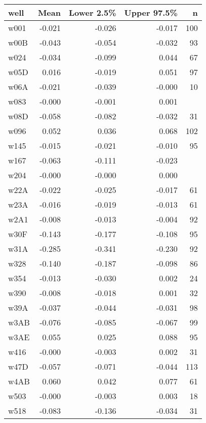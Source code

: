 \begin{table}[ht]
\centering
\begingroup\fontsize{9pt}{9pt}\selectfont
\begin{tabular}{lrrrr}
  \hline
well & Mean & Lower 2.5\% & Upper 97.5\% & n \\ 
  \hline
w001 & -0.021 & -0.026 & -0.017 &  100 \\ 
  w00B & -0.043 & -0.054 & -0.032 &   93 \\ 
  w024 & -0.034 & -0.099 & 0.044 &   67 \\ 
  w05D & 0.016 & -0.019 & 0.051 &   97 \\ 
  w06A & -0.021 & -0.039 & -0.000 &   10 \\ 
  w083 & -0.000 & -0.001 & 0.001 &  \\ 
  w08D & -0.058 & -0.082 & -0.032 &   31 \\ 
  w096 & 0.052 & 0.036 & 0.068 &  102 \\ 
  w145 & -0.015 & -0.021 & -0.010 &   95 \\ 
  w167 & -0.063 & -0.111 & -0.023 &  \\ 
  w204 & -0.000 & -0.000 & 0.000 &  \\ 
  w22A & -0.022 & -0.025 & -0.017 &   61 \\ 
  w23A & -0.016 & -0.019 & -0.013 &   61 \\ 
  w2A1 & -0.008 & -0.013 & -0.004 &   92 \\ 
  w30F & -0.143 & -0.177 & -0.108 &   95 \\ 
  w31A & -0.285 & -0.341 & -0.230 &   92 \\ 
  w328 & -0.140 & -0.187 & -0.098 &   86 \\ 
  w354 & -0.013 & -0.030 & 0.002 &   24 \\ 
  w390 & -0.008 & -0.018 & 0.001 &   32 \\ 
  w39A & -0.037 & -0.044 & -0.031 &   98 \\ 
  w3AB & -0.076 & -0.085 & -0.067 &   99 \\ 
  w3AE & 0.055 & 0.025 & 0.088 &   95 \\ 
  w416 & -0.000 & -0.003 & 0.002 &   31 \\ 
  w47D & -0.057 & -0.071 & -0.044 &  113 \\ 
  w4AB & 0.060 & 0.042 & 0.077 &   61 \\ 
  w503 & -0.000 & -0.003 & 0.003 &   18 \\ 
  w518 & -0.083 & -0.136 & -0.034 &   31 \\ 

\end{tabular}
\end{table}
